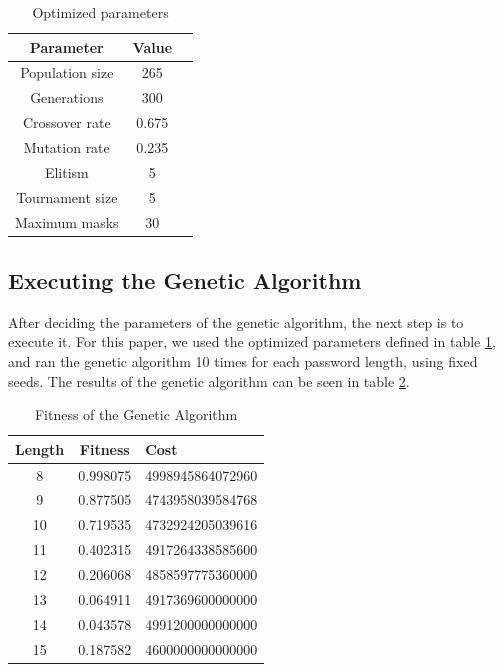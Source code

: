 \documentclass[sigconf,authordraft]{acmart}
\begin{document}
\begin{table}
  \caption{Optimized parameters}
  \label{tab:parameters}
  \begin{tabular}{ccl}
    \toprule
    Parameter & Value \\
    \midrule
    Population size & 265 \\
    Generations & 300 \\
    Crossover rate & 0.675 \\
    Mutation rate & 0.235 \\
    Elitism & 5 \\
    Tournament size & 5 \\
    Maximum masks & 30 \\
    \bottomrule
  \end{tabular}
\end{table}

\subsection{Executing the Genetic Algorithm}

After deciding the parameters of the genetic algorithm, the next step is to execute it.
For this paper, we used the optimized parameters defined in table \ref{tab:parameters}, and ran the genetic algorithm 10 times for each password length, using fixed seeds.
The results of the genetic algorithm can be seen in table \ref{tab:fitness_genetic}.

\begin{table}
  \caption{Fitness of the Genetic Algorithm}
  \label{tab:fitness_genetic}
  \begin{tabular}{ccl}
    \toprule
    Length & Fitness & Cost \\
    \midrule
    8 & 0.998075 & 4998945864072960	 \\
    9 & 0.877505 & 4743958039584768 \\
    10 & 0.719535 & 4732924205039616 \\
    11 & 0.402315	 & 4917264338585600 \\
    12 & 0.206068 & 4858597775360000	 \\
    13 & 0.064911	 & 4917369600000000 \\
    14 & 0.043578	 & 4991200000000000 \\
    15 & 0.187582 & 4600000000000000 \\
    \bottomrule
  \end{tabular}
\end{table}
\end{document}
